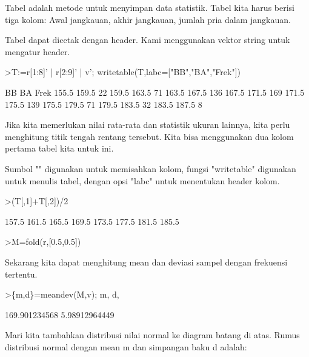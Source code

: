 \documentclass{article}
\begin{document}
\begin{eulernotebook}
\begin{eulercomment}
\begin{eulercomment}
\begin{eulercomment}
Tabel adalah metode untuk menyimpan data statistik. Tabel kita harus
berisi tiga kolom: Awal jangkauan, akhir jangkauan, jumlah pria dalam
jangkauan.

Tabel dapat dicetak dengan header. Kami menggunakan vektor string
untuk mengatur header.
\end{eulercomment}
\begin{eulerprompt}
>T:=r[1:8]' | r[2:9]' | v'; writetable(T,labc=["BB","BA","Frek"])
\end{eulerprompt}
\begin{euleroutput}
          BB        BA      Frek
       155.5     159.5        22
       159.5     163.5        71
       163.5     167.5       136
       167.5     171.5       169
       171.5     175.5       139
       175.5     179.5        71
       179.5     183.5        32
       183.5     187.5         8
\end{euleroutput}
\begin{eulercomment}
Jika kita memerlukan nilai rata-rata dan statistik ukuran lainnya,
kita perlu menghitung titik tengah rentang tersebut. Kita bisa
menggunakan dua kolom pertama tabel kita untuk ini.

Sumbol "\textbar{}" digunakan untuk memisahkan kolom, fungsi "writetable"
digunakan untuk menulis tabel, dengan opsi "labc" untuk menentukan
header kolom.
\end{eulercomment}
\begin{eulerprompt}
>(T[,1]+T[,2])/2 
\end{eulerprompt}
\begin{euleroutput}
          157.5 
          161.5 
          165.5 
          169.5 
          173.5 
          177.5 
          181.5 
          185.5 
\end{euleroutput}
\begin{eulerprompt}
>M=fold(r,[0.5,0.5])
\end{eulerprompt}
\begin{euleroutput}
  [157.5,  161.5,  165.5,  169.5,  173.5,  177.5,  181.5,  185.5]
\end{euleroutput}
\begin{eulercomment}
Sekarang kita dapat menghitung mean dan deviasi sampel dengan
frekuensi tertentu.
\end{eulercomment}
\begin{eulerprompt}
>\{m,d\}=meandev(M,v); m, d,
\end{eulerprompt}
\begin{euleroutput}
  169.901234568
  5.98912964449
\end{euleroutput}
\begin{eulercomment}
Mari kita tambahkan distribusi nilai normal ke diagram batang di atas.
Rumus distribusi normal dengan mean m dan simpangan baku d adalah:


\end{eulercomment}
\end{eulercomment}
\end{eulercomment}
\end{eulernotebook}
\end{document}
